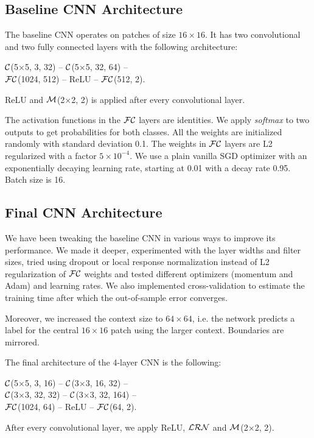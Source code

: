 \documentclass[10pt,conference,compsocconf]{IEEEtran}
\newcommand{\conv}[3]{$ \cal{C} $(#1$ \times  $#1, #2, #3)}
\newcommand{\maxpool}[2]{$ \cal{M} $(#1$ \times $#1, #2)}
\newcommand{\lrn}{$ \cal{LRN}~$}
\newcommand{\fc}[2]{$ \cal{FC} $(#1, #2)}
\begin{document}
\subsection{Baseline CNN Architecture}
\label{subsec:baselineCNN}
The baseline CNN operates on patches of size $16 \times 16$. It has two convolutional and two fully connected layers with the following architecture:
\begin{center}
	\conv{5}{3}{32} -- \conv{5}{32}{64} -- \\ 
	\fc{1024}{512} -- ReLU -- \fc{512}{2}.
\end{center}
ReLU and \maxpool{2}{2} is applied after every convolutional layer.

The activation functions in the $ \cal{FC} $ layers are identities. We apply \textit{softmax} to two outputs to get probabilities for both classes. All the weights are initialized randomly with standard deviation 0.1. The weights in $ \cal{FC} $ layers are L2 regularized with a factor $ 5 \times 10^{-4} $. We use a plain vanilla SGD optimizer with an exponentially decaying learning rate, starting at 0.01 with a decay rate 0.95. Batch size is 16. 

\subsection{Final CNN Architecture}
\label{subsec:CNN}
We have been tweaking the baseline CNN in various ways to improve its performance. We made it deeper, experimented with the layer widths and filter sizes, tried using dropout or local response normalization instead of L2 regularization of $ \cal{FC} $ weights and tested different optimizers (momentum and Adam) and learning rates. We also implemented cross-validation to estimate the training time after which the out-of-sample error converges.

Moreover, we increased the context size to $ 64\times64 $, i.e. the network predicts a label for the central $ 16\times16 $ patch using the larger context. Boundaries are mirrored.

The final architecture of the 4-layer CNN is the following:
\begin{center}
	\conv{5}{3}{16} -- \conv{3}{16}{32} -- \\ 
	\conv{3}{32}{32} -- \conv{3}{32}{164} -- \\
	\fc{1024}{64} -- ReLU -- \fc{64}{2}.
\end{center}
After every convolutional layer, we apply ReLU, \lrn and \maxpool{2}{2}.
\end{document}

